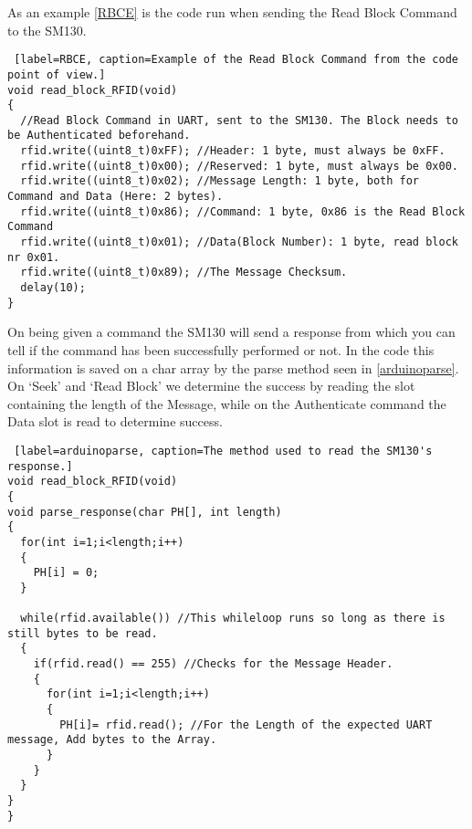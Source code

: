 As an example \autoref{RBCE} is the code run when sending the Read Block Command to the SM130.
\begin{lstlisting} [label=RBCE, caption=Example of the Read Block Command from the code point of view.]
void read_block_RFID(void)
{
  //Read Block Command in UART, sent to the SM130. The Block needs to be Authenticated beforehand.
  rfid.write((uint8_t)0xFF); //Header: 1 byte, must always be 0xFF.
  rfid.write((uint8_t)0x00); //Reserved: 1 byte, must always be 0x00.  
  rfid.write((uint8_t)0x02); //Message Length: 1 byte, both for Command and Data (Here: 2 bytes).
  rfid.write((uint8_t)0x86); //Command: 1 byte, 0x86 is the Read Block Command
  rfid.write((uint8_t)0x01); //Data(Block Number): 1 byte, read block nr 0x01. 
  rfid.write((uint8_t)0x89); //The Message Checksum.
  delay(10); 
}													
\end{lstlisting}


On being given a command the SM130 will send a response from which you can tell if the command has been successfully performed or not.
In the code this information is saved on a char array by the parse method seen in \autoref{arduinoparse}. 
On `Seek' and `Read Block' we determine the success by reading the slot containing the length of the Message, while on the Authenticate command the Data slot is read to determine success.

\begin{lstlisting} [label=arduinoparse, caption=The method used to read the SM130's response.]
void read_block_RFID(void)
{
void parse_response(char PH[], int length)
{
  for(int i=1;i<length;i++)
  {
    PH[i] = 0;
  }
  
  while(rfid.available()) //This whileloop runs so long as there is still bytes to be read. 
  {
    if(rfid.read() == 255) //Checks for the Message Header.
    {
      for(int i=1;i<length;i++)
      {
        PH[i]= rfid.read(); //For the Length of the expected UART message, Add bytes to the Array.
      }
    }
  }
}
}													
\end{lstlisting}


